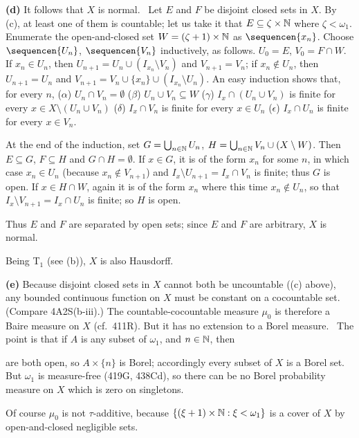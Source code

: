 {\medskip

{\bf (d)} It follows that $X$ is normal.   \Prf\ Let $E$ and $F$ be
disjoint closed sets in $X$.   By (c), at least one of them is
countable;  let us take it that $E\subseteq\zeta\times\Bbb N$ where
$\zeta<\omega_1$.   Enumerate the open-and-closed set
$W=(\zeta+1)\times\Bbb N$ as $\sequencen{x_n}$.   Choose
$\sequencen{U_n}$, $\sequencen{V_n}$ inductively, as follows.   $U_0=E$,
$V_0=F\cap W$.   If $x_n\in U_n$, then $U_{n+1}=U_n\cup
(I_{x_n}\setminus V_n)$ and $V_{n+1}=V_n$;  if $x_n\notin U_n$, then
$U_{n+1}=U_n$ and $V_{n+1}=V_n\cup\{x_n\}\cup(I_{x_n}\setminus U_n)$.
An easy induction shows that, for every $n$, ($\alpha$) $U_n\cap
V_n=\emptyset$ ($\beta$) $U_n\cup V_n\subseteq W$ ($\gamma$)
$I_x\cap(U_n\cup V_n)$ is finite for every $x\in X\setminus(U_n\cup
V_n)$ ($\delta$) $I_x\cap V_n$ is finite for every $x\in U_n$
($\epsilon$) $I_x\cap U_n$ is finite for every $x\in V_n$.

At the end of the induction, set $G=\bigcup_{n\in\Bbb N}U_n$,
$H=\bigcup_{n\in\Bbb N}V_n\cup(X\setminus W)$.   Then $E\subseteq G$,
$F\subseteq H$ and $G\cap H=\emptyset$.   If $x\in G$, it is of the form
$x_n$ for some $n$, in which case $x_n\in U_n$ (because $x_n\notin
V_{n+1}$) and $I_x\setminus U_{n+1}=I_x\cap V_n$ is finite;  thus $G$ is
open.   If $x\in H\cap W$, again it is of the form $x_n$ where this time
$x_n\notin U_n$, so that $I_x\setminus V_{n+1}=I_x\cap U_n$ is finite;
so $H$ is open.

Thus $E$ and $F$ are separated by open sets;  since $E$ and $F$ are
arbitrary, $X$ is normal.\ \Qed

Being T$_1$ (see (b)), $X$ is also Hausdorff.

\medskip

{\bf (e)} Because disjoint closed sets in $X$ cannot both be uncountable
((c) above), any bounded continuous function on $X$ must be constant
on a cocountable set.   (Compare 4A2S(b-iii).)
The countable-cocountable measure $\mu_0$ is therefore a Baire measure
on $X$ (cf.\ 411R).   But it has no extension to a Borel measure.
\Prf\ The point is that if $A$ is any subset of $\omega_1$, and
$n\in\Bbb N$, then


\noindent are both open, so $A\times\{n\}$ is Borel;  accordingly every
subset of $X$ is a Borel set.   But $\omega_1$ is measure-free
(419G, 438Cd), so there can be no Borel probability measure on $X$ which
is zero on singletons.\ \Qed

Of course $\mu_0$ is not $\tau$-additive, because $\{(\xi+1)\times\Bbb
N:\xi<\omega_1\}$ is a cover of $X$ by open-and-closed negligible sets.
}%

